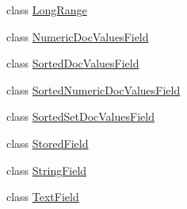 \begin{DoxyCompactItemize}
\item 
class \mbox{\hyperlink{classlucene_1_1core_1_1document_1_1LongRange}{Long\+Range}}
\item 
class \mbox{\hyperlink{classlucene_1_1core_1_1document_1_1NumericDocValuesField}{Numeric\+Doc\+Values\+Field}}
\item 
class \mbox{\hyperlink{classlucene_1_1core_1_1document_1_1SortedDocValuesField}{Sorted\+Doc\+Values\+Field}}
\item 
class \mbox{\hyperlink{classlucene_1_1core_1_1document_1_1SortedNumericDocValuesField}{Sorted\+Numeric\+Doc\+Values\+Field}}
\item 
class \mbox{\hyperlink{classlucene_1_1core_1_1document_1_1SortedSetDocValuesField}{Sorted\+Set\+Doc\+Values\+Field}}
\item 
class \mbox{\hyperlink{classlucene_1_1core_1_1document_1_1StoredField}{Stored\+Field}}
\item 
class \mbox{\hyperlink{classlucene_1_1core_1_1document_1_1StringField}{String\+Field}}
\item 
class \mbox{\hyperlink{classlucene_1_1core_1_1document_1_1TextField}{Text\+Field}}
\end{DoxyCompactItemize}
